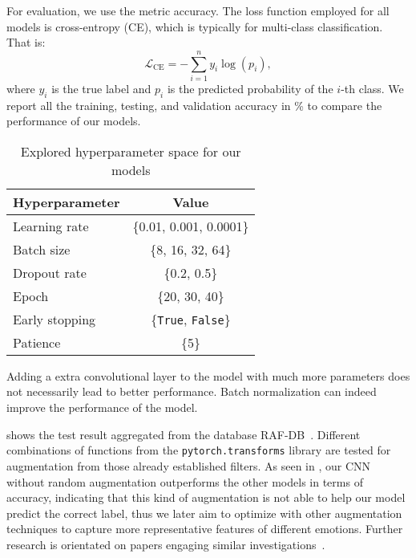 For evaluation, we use the metric accuracy. 
The loss function employed for all models is cross-entropy (CE), which is typically for multi-class classification. 
That is:
\begin{equation}
  \mathcal{L}_{\text{CE}} = -\sum_{i=1}^{n} y_i \log(p_i),
\end{equation}
where $y_i$ is the true label and $p_i$ is the predicted probability of the $i$-th class.
We report all the training, testing, and validation accuracy in \% to compare the performance of our models. 

\begin{table}%
  \centering
  \begin{tabular}{@{}lc@{}}
    \toprule
    Hyperparameter & Value \\
    \midrule
    Learning rate & \{0.01, 0.001, 0.0001\}  \\
    Batch size & \{8, 16, 32, 64\} \\
    Dropout rate & \{0.2, 0.5\} \\
    Epoch & \{20, 30, 40\} \\
    Early stopping & \{\texttt{True}, \texttt{False}\} \\
    Patience & \{5\} \\
    \bottomrule
  \end{tabular}
  \caption{Explored hyperparameter space for our models}
  \label{tab:hyper}
\end{table}

Adding a extra convolutional layer to the model with much more parameters does not necessarily lead to better performance.
Batch normalization can indeed improve the performance of the model. 

 shows the test result aggregated from the database RAF-DB~\cite{kaggle_rafdb}.
Different combinations of functions from the \texttt{pytorch.transforms} library are tested for augmentation from those already established filters. %
As seen in , 
our CNN without random augmentation outperforms the other models in terms of accuracy, 
indicating that this kind of augmentation is not able to help our model predict the correct label, 
thus we later aim to optimize with other augmentation techniques to capture more representative features of different emotions.
Further research is orientated on papers engaging similar investigations~\cite{ZeilerF14,li_reliable_2017,VermaMRMV23}.


